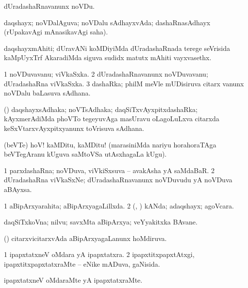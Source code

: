 {{{{{{\noindent 	 
\gl{\akirx}
\expl{}
\bmng
 dUradashaRnavanunx noVDu. 
\emng
\eentry

\bentry
{} 
\gl{\gu}
\expl{}
\bmng
 daqshayx; noVDalAguva; noVDalu sAdhayxvAda; dashaRnasAdhayx (rUpakavAgi mAnasikavAgi saha). 
\emng
\eentry

\bentry
{} 
\gl{\nA}
\expl{}
\bmng
 daqshayxmAhiti; dUravANi koMDiyiMda dUradashaRnada terege seVrisida kaMpUyxTrf AkaradiMda siguva sudidx matutx mAhiti vayxvasethx. 
\emng
\eentry

\bentry
{} 
\gl{\nA}
\expl{}
\bmng
\bnum
\num{1} noVDuvavanu; viVkaSxka. 
\num{2} dUradashaRnavanunx noVDuvavanu; dUradashaRna viVkaSxka. 
\num{3} dashaRka; philM meVle mUDisiruva citarx \mo vanunx noVDalu baLasuva sAdhana. 
\enum
\emng
\eentry

\bentry
{} 
\gl{\nA}
\expl{}
\bmng
 (\CA) daqshayxsAdhaka; noVTsAdhaka; daqSiTxvAyxpitxdashaRka; kAyxmerAdiMda phoVTo tegeyuvAga masUravu oLagoLuLxva citarxda keSxVtarxvAyxpitxyanunx toVrisuva sAdhana. 
\emng
\eentry

\bentry
{}
\gl{\nA}
\expl{}
\bmng
 (beVTe) hoV! kaMDitu, kaMDitu! (marasiniMda nariyu horahoraTAga beVTegAranu kUguva saMtoVSa utAsxhagaLa kUgu). 
\emng
\eentry

\bentry
{} 
\gl{\nA}
\expl{}
\bmng
\bnum
\num{1} parxdashaRna; noVDuva, viVkiSxsuva -- avakAsha yA saMdaBaR. 
\num{2} dUradashaRna viVkaSxNe; dUradashaRnavanunx noVDuvudu yA noVDuva aBAyxsa. 
\enum
\emng
\eentry

\bentry
{} 
\gl{\gu}
\expl{}
\bmng
\bnum
\num{1} aBipArxyarahita; aBipArxyagaLillxda. 
\num{2} (\kAparx, \alaMshA) kANda; adaqshayx; agoVcara. 
\enum
\emng
\eentry

\bentry
{} 
\gl{\nA}
\expl{}
\bmng
 daqSiTxkoVna; nilvu; savxMta aBipArxya; veYyakitxka BAvane. 
\emng
\eentry

\bentry
{} 
\gl{\gu}
\expl{}
\bmng
 (\AmA) citarxvicitarxvAda aBipArxyagaLanunx hoMdiruva. 
\emng
\eentry

\bentry
{} 
\gl{\gu}
\expl{}
\bmng
\bnum
\num{1} ipapxtatxneV oMdara yA ipapxtatxra. 
\num{2} ipapxtitxpapxtAtxgi, ipapxtitxpapxtatxraMte -- eNike mADuva, gaNisida. 
\enum
\emng
\eentry

\bentry
{} 
\gl{\kirxvi}
\expl{}
\bmng
 ipapxtatxneV oMdaraMte yA ipapxtatxraMte. 
\emng
\eentry

}}}}}}
